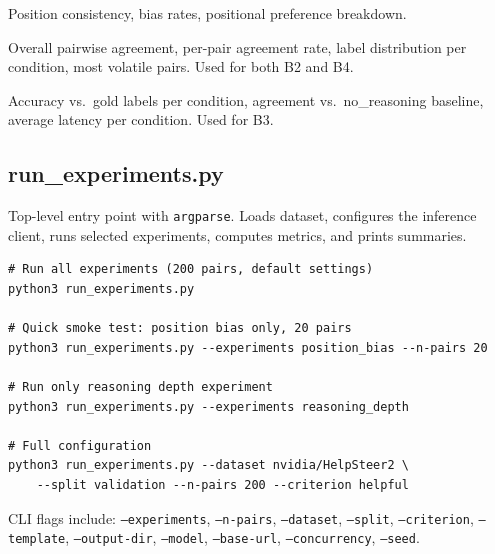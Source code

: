 \documentclass[11pt,a4paper]{article}
\begin{document}
\begin{description}[style=nextline, leftmargin=1.5cm]
  \item[\texttt{compute\_position\_bias}] Position consistency, bias rates,
    positional preference breakdown.
  \item[\texttt{compute\_pairwise\_agreement}] Overall pairwise agreement,
    per-pair agreement rate, label distribution per condition, most volatile
    pairs. Used for both B2 and B4.
  \item[\texttt{compute\_thinking\_accuracy}] Accuracy vs.\ gold labels per
    condition, agreement vs.\ no\_reasoning baseline, average latency per
    condition. Used for B3.
\end{description}


\subsection{run\_experiments.py}

\begin{modulebox}
Top-level entry point with \texttt{argparse}. Loads dataset, configures
the inference client, runs selected experiments, computes metrics, and
prints summaries.
\end{modulebox}

\begin{codebox}
\begin{lstlisting}
# Run all experiments (200 pairs, default settings)
python3 run_experiments.py

# Quick smoke test: position bias only, 20 pairs
python3 run_experiments.py --experiments position_bias --n-pairs 20

# Run only reasoning depth experiment
python3 run_experiments.py --experiments reasoning_depth

# Full configuration
python3 run_experiments.py --dataset nvidia/HelpSteer2 \
    --split validation --n-pairs 200 --criterion helpful
\end{lstlisting}
\end{codebox}

CLI flags include: \texttt{--experiments}, \texttt{--n-pairs},
\texttt{--dataset}, \texttt{--split}, \texttt{--criterion},
\texttt{--template}, \texttt{--output-dir},
\texttt{--model}, \texttt{--base-url}, \texttt{--concurrency},
\texttt{--seed}.


\newpage
\end{document}
